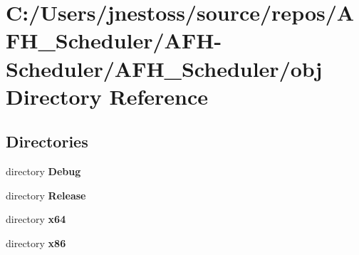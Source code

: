 \section{C\+:/\+Users/jnestoss/source/repos/\+A\+F\+H\+\_\+\+Scheduler/\+A\+F\+H-\/\+Scheduler/\+A\+F\+H\+\_\+\+Scheduler/obj Directory Reference}
\label{dir_df309c5fd8be4521e3bb72ceeb15e276}
\subsection*{Directories}
\begin{DoxyCompactItemize}
\item 
directory \textbf{ Debug}
\item 
directory \textbf{ Release}
\item 
directory \textbf{ x64}
\item 
directory \textbf{ x86}
\end{DoxyCompactItemize}
